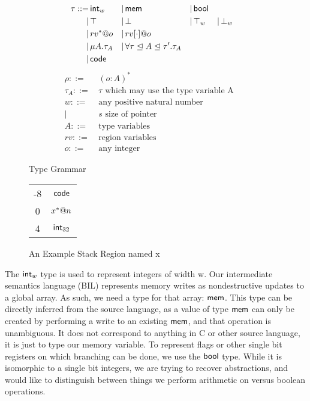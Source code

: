 \begin{figure}[t]
\begin{align*}
\tau ::=&\, \mathsf{int}_{w} &|&\, \mathsf{mem} &|&\, \mathsf{bool} \\
     |&\, \top &|&\, \bot &|&\, \top_{w} &|&\, \bot_{w}\\
     |&\, rv^*@o &|&\, rv[\cdot]@o\\
     |&\, \mu A. \tau_A &|&\, \forall \tau\mathrel{\unlhd} A\mathrel{\unlhd} \tau'.\tau_A\\
     |&\, \mathsf{code}
\end{align*}
\vspace{-2.0\baselineskip}
\begin{align*}
\rho ::=&\, (o : A)^* && \\
\tau_A ::=&\, \tau \textrm{ which may use the type variable A}\\
w ::=&\, \textrm{any positive natural number}\\
    |&\, s \textrm{ size of pointer}\\
A ::=&\, \textrm{type variables}\\
rv ::=&\, \textrm{region variables}\\
o ::=&\, \textrm{any integer}
\end{align*}
\caption{Type Grammar}
\label{fig:tform}
\end{figure}
\begin{figure}
\begin{center}
\begin{tabular}{|c|c|}
\hline
-8 & $\mathsf{code}$\\
0 & $x^*@n$\\
4 & $\mathsf{int}_{32}$\\
\hline
\end{tabular}
\end{center}
\caption{An Example Stack Region named x}
\label{fig:region}
\end{figure}

The $\mathsf{int}_{w}$ type is used to represent integers of width w.
Our intermediate semantics language (BIL) represents memory writes as nondestructive updates to a global array. As such, we need a type for that array: $\mathsf{mem}$. This type can be directly inferred from the source language, as a value of type $\mathsf{mem}$ can only be created by performing a write to an existing $\mathsf{mem}$, and that operation is unambiguous. It does not correspond to anything in C or other source language, it is just to type our memory variable.
To represent flags or other single bit registers on which branching can be done, we use the $\mathsf{bool}$ type. While it is isomorphic to a single bit integers, we are trying to recover abstractions, and would like to distinguish between things we perform arithmetic on versus boolean operations.

